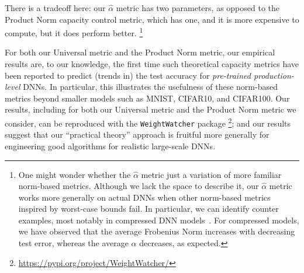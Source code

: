There is a tradeoff here: our $\hat{\alpha}$ metric has two parameters, as opposed to the Product Norm capacity control metric, which has one, and it is more expensive to compute, but it does perform better.%
\footnote{One might wonder whether the $\hat{\alpha}$ metric just a variation of more familiar norm-based metrics.  Although we lack the space to describe it, our $\hat{\alpha}$ metric works more generally on actual DNNs when other norm-based metrics inspired by worst-case bounds fail.  In particular, we can identify counter examples, most notably in compressed DNN models~\cite{CWZZ17_TR}.  For compressed models, we have observed that the average Frobenius Norm increases with decreasing test error, whereas the average $\alpha$ decreases, as expected.}

For both our Universal metric and the Product Norm metric, our empirical results are, to our knowledge, the first time such theoretical capacity metrics have been reported to predict (trends in) the test accuracy for \emph{pre-trained production-level} DNNs.
In particular, this illustrates the usefulness of these norm-based metrics beyond smaller models such as MNIST, CIFAR10, and CIFAR100. 
Our 
results, including for both our Universal metric and the Product Norm metric we consider, can be reproduced with the \texttt{WeightWatcher} package%
\footnote{\url{https://pypi.org/project/WeightWatcher/}};
and our
results suggest that our ``practical theory'' approach is fruitful more generally for engineering good algorithms for realistic large-scale DNNs.


